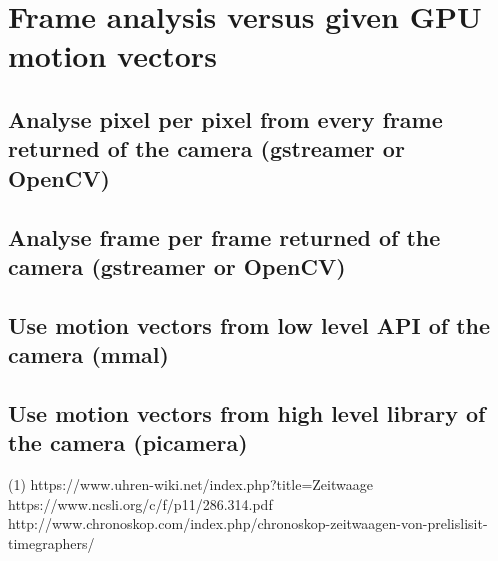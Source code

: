 \documentclass[11pt]{report}
\begin{document}
\section{Frame analysis versus given GPU motion vectors}

\subsection{Analyse pixel per pixel from every frame returned of the camera (gstreamer or OpenCV)}

\subsection{Analyse frame per frame returned of the camera (gstreamer or OpenCV)}
\subsection{Use motion vectors from low level API of the camera (mmal)}
\subsection{Use motion vectors from high level library of the camera (picamera)}

\begin{thebibliography}{9}
(1) https://www.uhren-wiki.net/index.php?title=Zeitwaage
 https://www.ncsli.org/c/f/p11/286.314.pdf
 http://www.chronoskop.com/index.php/chronoskop-zeitwaagen-von-prelislisit-timegraphers/
\end{thebibliography}
\end{document}
